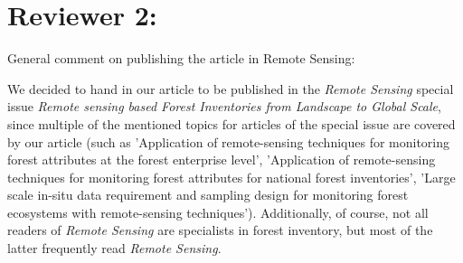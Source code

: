 \documentclass{article}
\begin{document}

\section*{Reviewer 2:}

General comment on publishing the article in Remote Sensing:

We decided to hand in our article to be published in the \textit{Remote Sensing} special issue \textit{Remote sensing based Forest Inventories from Landscape to Global Scale}, since multiple of the mentioned topics for articles of the special issue are covered by our article (such as 'Application of remote-sensing techniques for monitoring forest attributes at the forest enterprise level', 'Application of remote-sensing techniques for monitoring forest attributes for national forest inventories', 'Large scale in-situ data requirement and sampling design for monitoring forest ecosystems with remote-sensing techniques').  Additionally, of course, not all readers of \textit{Remote Sensing} are specialists in forest inventory, but most of the latter frequently read \textit{Remote Sensing}.
\end{document}
